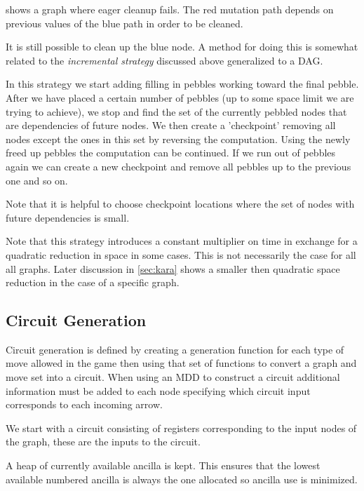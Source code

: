  shows a graph where eager cleanup fails. The red mutation
path depends on previous values of the blue path in order to be cleaned.

It is still possible to clean up the blue node. A method for doing this is
somewhat related to the \emph{incremental strategy} discussed above generalized
to a DAG.

In this strategy we start adding filling in pebbles working toward the final
pebble. After we have placed a certain number of pebbles (up to some space
limit we are trying to achieve), we stop and find the set of the currently
pebbled nodes that are dependencies of future nodes. We then create a
'checkpoint' removing all nodes except the ones in this set by reversing the
computation.  Using the newly freed up pebbles the computation can be
continued.  If we run out of pebbles again we can create a new checkpoint and
remove all pebbles up to the previous one and so on.

Note that it is helpful to choose checkpoint locations where the set of nodes
with future dependencies is small.

Note that this strategy introduces a constant multiplier on time in exchange
for a quadratic reduction in space in some cases. This is not necessarily the
case for all all graphs. Later discussion in \cref{sec:kara} shows a smaller
then quadratic space reduction in the case of a specific graph.

\subsection{Circuit Generation}

Circuit generation is defined by creating a generation function for each type
of move allowed in the game then using that set of functions to convert a graph
and move set into a circuit. When using an MDD to construct a circuit additional
information must be added to each node specifying which circuit input
corresponds to each incoming arrow.

We start with a circuit consisting of registers corresponding to the input nodes
of the graph, these are the inputs to the circuit.

A heap of currently available ancilla is kept. This ensures that the
lowest available numbered ancilla is always the one allocated so ancilla use is
minimized.

